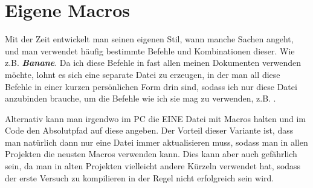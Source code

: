 \section{Eigene Macros}

Mit der Zeit entwickelt man seinen eigenen Stil, wann manche Sachen angeht, und man verwendet häufig bestimmte Befehle und Kombinationen dieser. Wie z.B. \hspace{2cm} \emph{\textbf{Banane}}. Da ich diese Befehle in fast allen meinen Dokumenten verwenden möchte, lohnt es sich eine separate Datei zu erzeugen, in der man all diese Befehle in einer kurzen persönlichen Form drin sind, sodass ich nur diese Datei anzubinden brauche, um die Befehle wie ich sie mag zu verwenden, z.B. \hs {}.

Alternativ kann man irgendwo im PC die EINE Datei mit Macros halten und im Code den Absolutpfad auf diese angeben. Der Vorteil dieser Variante ist, dass man natürlich dann nur eine Datei immer aktualisieren muss, sodass man in allen Projekten die neusten Macros verwenden kann. Dies kann aber auch gefährlich sein, da man in alten Projekten vielleicht andere Kürzeln verwendet hat, sodass der erste Versuch zu kompilieren in der Regel nicht erfolgreich sein wird.